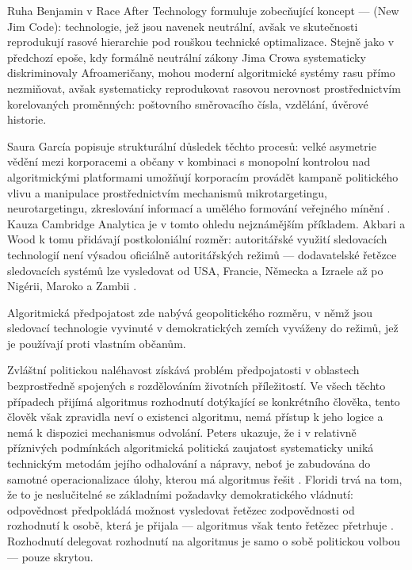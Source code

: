 Ruha Benjamin v Race After Technology \parencite{Benjamin19} formuluje zobecňující koncept —  (New Jim Code): technologie, jež jsou navenek neutrální, avšak ve skutečnosti reprodukují rasové hierarchie pod rouškou technické optimalizace.
Stejně jako v předchozí epoše, kdy formálně neutrální zákony Jima Crowa systematicky diskriminovaly Afroameričany, mohou moderní algoritmické systémy rasu přímo nezmiňovat, avšak systematicky reprodukovat rasovou nerovnost prostřednictvím korelovaných proměnných: poštovního směrovacího čísla, vzdělání, úvěrové historie.

Saura García popisuje strukturální důsledek těchto procesů: velké asymetrie vědění mezi korporacemi a občany v kombinaci s monopolní kontrolou nad algoritmickými platformami umožňují korporacím provádět kampaně politického vlivu a manipulace prostřednictvím mechanismů mikrotargetingu, neurotargetingu, zkreslování informací a umělého formování veřejného mínění \parencite{SauraGarcia24}. Kauza Cambridge Analytica je v tomto ohledu nejznámějším příkladem. Akbari a Wood k tomu přidávají postkoloniální rozměr: autoritářské využití sledovacích technologií není výsadou oficiálně autoritářských režimů — dodavatelské řetězce sledovacích systémů lze vysledovat od USA, Francie, Německa a Izraele až po Nigérii, Maroko a Zambii \parencite{AkbariWood25}.

Algoritmická předpojatost zde nabývá geopolitického rozměru, v němž jsou sledovací technologie vyvinuté v demokratických zemích vyváženy do režimů, jež je používají proti vlastním občanům.

Zvláštní politickou naléhavost získává problém předpojatosti v oblastech bezprostředně spojených s rozdělováním životních příležitostí. Ve všech těchto případech přijímá algoritmus rozhodnutí dotýkající se konkrétního člověka, tento člověk však zpravidla neví o existenci algoritmu, nemá přístup k jeho logice a nemá k dispozici mechanismus odvolání. Peters ukazuje, že i v relativně příznivých podmínkách algoritmická politická zaujatost systematicky uniká technickým metodám jejího odhalování a nápravy, neboť je zabudována do samotné operacionalizace úlohy, kterou má algoritmus řešit \parencite{Peters22}. Floridi trvá na tom, že to je neslučitelné se základními požadavky demokratického vládnutí: odpovědnost předpokládá možnost vysledovat řetězec zodpovědnosti od rozhodnutí k osobě, která je přijala — algoritmus však tento řetězec přetrhuje \parencite{Floridi23}. Rozhodnutí delegovat rozhodnutí na algoritmus je samo o sobě politickou volbou — pouze skrytou.


